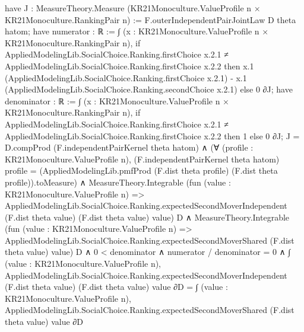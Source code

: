 \documentclass[10pt]{article}
\begin{document}
\begin{ReviewVerbatim}
                have J : MeasureTheory.Measure (KR21Monoculture.ValueProfile n × KR21Monoculture.RankingPair n) :=
                  F.outerIndependentPairJointLaw D theta hatom;
                have numerator : ℝ :=
                  ∫ (x : KR21Monoculture.ValueProfile n × KR21Monoculture.RankingPair n),
                    if
                        AppliedModelingLib.SocialChoice.Ranking.firstChoice x.2.1 ≠
                          AppliedModelingLib.SocialChoice.Ranking.firstChoice x.2.2 then
                      x.1 (AppliedModelingLib.SocialChoice.Ranking.firstChoice x.2.1) -
                        x.1 (AppliedModelingLib.SocialChoice.Ranking.secondChoice x.2.1)
                    else 0 ∂J;
                have denominator : ℝ :=
                  ∫ (x : KR21Monoculture.ValueProfile n × KR21Monoculture.RankingPair n),
                    if
                        AppliedModelingLib.SocialChoice.Ranking.firstChoice x.2.1 ≠
                          AppliedModelingLib.SocialChoice.Ranking.firstChoice x.2.2 then
                      1
                    else 0 ∂J;
                J = D.compProd (F.independentPairKernel theta hatom) ∧
                  (∀ (profile : KR21Monoculture.ValueProfile n),
                      (F.independentPairKernel theta hatom) profile =
                        (AppliedModelingLib.pmfProd (F.dist theta profile) (F.dist theta profile)).toMeasure) ∧
                    MeasureTheory.Integrable
                        (fun (value : KR21Monoculture.ValueProfile n) =>
                          AppliedModelingLib.SocialChoice.Ranking.expectedSecondMoverIndependent (F.dist theta value)
                            (F.dist theta value) value)
                        D ∧
                      MeasureTheory.Integrable
                          (fun (value : KR21Monoculture.ValueProfile n) =>
                            AppliedModelingLib.SocialChoice.Ranking.expectedSecondMoverShared (F.dist theta value)
                              value)
                          D ∧
                        0 < denominator ∧
                          numerator / denominator = 0 ∧
                            ∫ (value : KR21Monoculture.ValueProfile n),
                                AppliedModelingLib.SocialChoice.Ranking.expectedSecondMoverIndependent
                                  (F.dist theta value) (F.dist theta value) value ∂D =
                              ∫ (value : KR21Monoculture.ValueProfile n),
                                AppliedModelingLib.SocialChoice.Ranking.expectedSecondMoverShared (F.dist theta value)
                                  value ∂D
\end{ReviewVerbatim}
\end{document}
